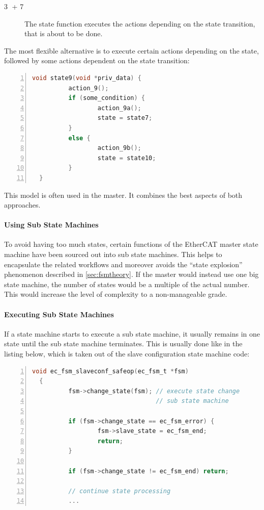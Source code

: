 \documentclass[a4paper,12pt,BCOR6mm,bibtotoc,idxtotoc]{scrbook}
\newcommand{\linenum}[1]{\normalfont\textcircled{\tiny #1}}
\begin{document}
\begin{description}

\item[\linenum{3} + \linenum{7}] The state function executes the actions
depending on the state transition, that is about to be done.

\end{description}

The most flexible alternative is to execute certain actions depending
on the state, followed by some actions dependent on the state
transition:

\begin{lstlisting}[gobble=2,language=C,numbers=left]
  void state9(void *priv_data) {
          action_9();
          if (some_condition) {
                  action_9a();
                  state = state7;
          }
          else {
                  action_9b();
                  state = state10;
          }
  }
\end{lstlisting}

This model is often used in the master. It combines the best aspects of both
approaches.

\paragraph{Using Sub State Machines}

To avoid having too much states, certain functions of the EtherCAT master
state machine have been sourced out into sub state machines.  This helps to
encapsulate the related workflows and moreover avoids the ``state explosion''
phenomenon described in \autoref{sec:fsmtheory}. If the master would instead
use one big state machine, the number of states would be a multiple of the
actual number. This would increase the level of complexity to a non-manageable
grade.

\paragraph{Executing Sub State Machines}

If a state machine starts to execute a sub state machine, it usually
remains in one state until the sub state machine terminates. This is
usually done like in the listing below, which is taken out of the
slave configuration state machine code:

\begin{lstlisting}[gobble=2,language=C,numbers=left]
  void ec_fsm_slaveconf_safeop(ec_fsm_t *fsm)
  {
          fsm->change_state(fsm); // execute state change
                                  // sub state machine

          if (fsm->change_state == ec_fsm_error) {
                  fsm->slave_state = ec_fsm_end;
                  return;
          }

          if (fsm->change_state != ec_fsm_end) return;

          // continue state processing
          ...
\end{lstlisting}
\end{document}
